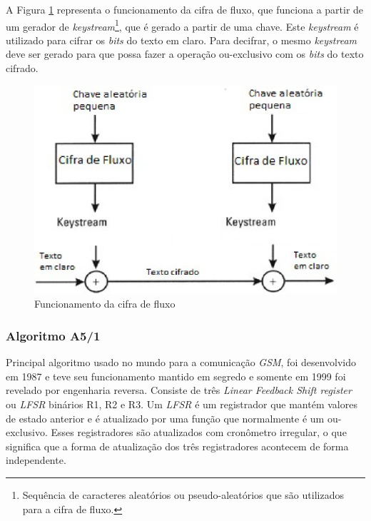 A Figura \ref{stream-cipher-functioning} representa o  funcionamento da cifra de fluxo, que funciona a partir de um gerador de \textit{keystream}\footnote{Sequência de caracteres aleatórios ou pseudo-aleatórios que são utilizados para a cifra de fluxo.}, que é gerado a partir de uma chave. Este \textit{keystream} é utilizado para cifrar os \textit{bits} do texto em claro. Para decifrar, o mesmo \textit{keystream} deve ser gerado para que possa fazer a operação ou-exclusivo com os \textit{bits} do texto cifrado.

\begin{figure}[h]
\centering
\includegraphics[keepaspectratio=true,scale=0.9]
    {figuras/stream_cipher.eps}
    \caption[Funcionamento da cifra de fluxo]{Funcionamento da cifra de fluxo\protect\footnotemark} 
    \label{stream-cipher-functioning}
\end{figure}

\subsubsection{Algoritmo A5/1}
\label{algorithm-a51}

Principal algoritmo usado no mundo para a comunicação \textit{GSM}, foi desenvolvido em 1987 e teve seu funcionamento mantido em segredo e somente em 1999 foi revelado por engenharia reversa. Consiste de três \textit{Linear Feedback Shift register} ou \textit{LFSR} binários R1, R2 e R3. Um \textit{LFSR} é um registrador que mantém valores de estado anterior e é atualizado por uma função que normalmente é um ou-exclusivo. Esses registradores são atualizados com cronômetro irregular, o que significa que a forma de atualização dos três registradores acontecem de forma independente. 

